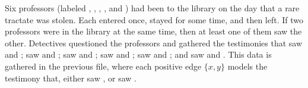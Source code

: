 \documentclass[a4paper,10pt,english]{sphinxhowto}
\begin{document}
\begin{sphinxVerbatim}[commandchars=\\\{\},numbers=left,firstnumber=1,stepnumber=1]
\PYG{p}{[}\PYG{p}{]}  
\PYG{p}{[}\PYG{p}{]}  
\PYG{p}{[}\PYG{p}{]}  
\PYG{p}{[}\PYG{p}{]}  
\PYG{p}{[}\PYG{p}{]}  
\end{sphinxVerbatim}

Six professors (labeled , , , ,  and ) had been to the library on the day that a rare tractate was stolen. Each entered once, stayed for some time, and then left. If two professors were in the library at the same time, then at least one of them saw the other. Detectives questioned the professors and gathered the testimonies that  saw  and ;  saw  and ;  saw  and ;  saw  and ;  saw  and ; and  saw  and . This data is gathered in the previous file, where each positive edge \(\{x,y\}\) models the testimony that, either  saw , or  saw .
\end{document}
